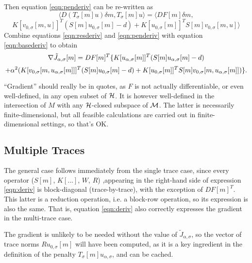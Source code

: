 Then equation \ref{eqn:penderiv} can be re-written as
\[
  \langle D(T_{\sigma}[m]u)\delta m, T_{\sigma}[m]u\rangle = \langle DF[m]\delta m, 
\]
\begin{equation}
  \label{eqn:penderiv}
   K[v_{0,\sigma}[m,u]]^T(S[m]u_{0,\sigma}[m]-d)
+
K[u_{0,\sigma}[m]]^T S[m]v_{0,\sigma}[m,u]\rangle
\end{equation}
Combine equations \ref{eqn:resderiv} and \ref{eqn:penderiv} with
equation \ref{eqn:basederiv} to obtain
\[
  \nabla \tilde{J}_{\alpha,\sigma}[m] =
  DF[m]^T\large\{ K[u_{\alpha,\sigma}[m]]^T (S[m]u_{\alpha,\sigma}[m]-d)
\]
\begin{equation}
  \label{eqn:deriv}
  + \alpha^2 (
  K[v_{0,\sigma}[m, u_{\alpha,\sigma}[m]]]^T(S[m]u_{0,\sigma}[m]-d)
+ K[u_{0,\sigma}[m]]^T S[m]v_{0,\sigma}[m,u_{\alpha,\sigma}[m]]) \large\}.
\end{equation}

 ``Gradient'' should really be in quotes, as $F$ is not actually differentiable, or even well-defined, in any open subset of ${\cal H}$. It is however well-defined in the intersection of $M$ with any ${\cal H}$-closed subspace of ${\cal M}$. The latter is necessarily finite-dimensional, but all feasible calculations are carried out in finite-dimensional settings, so that's OK.
 
\subsection{Multiple Traces}
The general case follows immediately from the single trace case, since
every operator ($S[m]$, $K[...]$, $W$, $R$) ,appearing in the right-hand side of expression
\ref{eqn:deriv} is block-diagonal (trace-by-trace), with the exception
of $DF[m]^T$. This latter is a reduction operation, i.e. a block-row
operation, so its expression is also the same. That is, equation
\ref{eqn:deriv} also correctly expresses the gradient in the
multi-trace case.

The gradient is unlikely to be needed without the value
of $\tilde{J}_{\alpha,\sigma}$, so the vector of trace norms
$Ru_{0,\sigma}[m]$ will have been computed, as it is a key ingredient
in the definition of the penalty
$T_{\sigma}[m]u_{\alpha,\sigma}$, and can be
cached.


